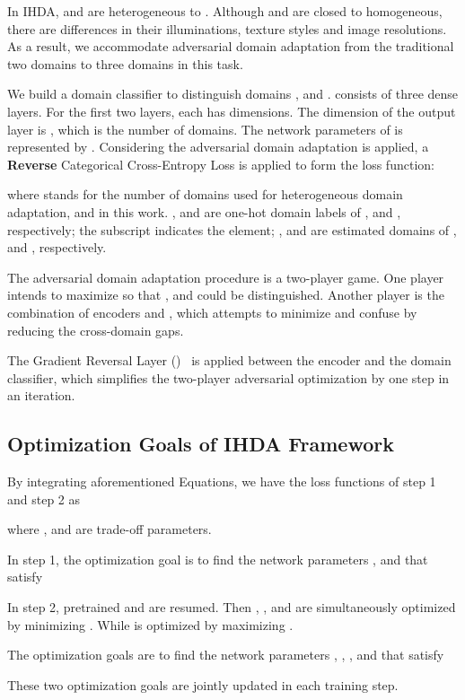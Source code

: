 \documentclass[journal]{IEEEtran}
\begin{document}
In IHDA,  and  are heterogeneous to . Although  and  are closed to homogeneous, there are differences in their illuminations, texture styles and image resolutions. As a result, we accommodate adversarial domain adaptation from the traditional two domains to three domains in this task. 

We build a domain classifier  to distinguish domains ,  and .  consists of three dense layers. For the first two layers, each has  dimensions. The dimension of the output layer is , which is the number of domains. The network parameters of  is represented by . Considering the adversarial domain adaptation is applied, a \textbf{Reverse} Categorical Cross-Entropy Loss is applied to form the loss function:

where  stands for the number of domains used for heterogeneous domain adaptation, and  in this work. ,  and  are one-hot domain labels of ,  and , respectively; the subscript  indicates the  element; ,  and  are estimated domains of ,  and , respectively. 

The adversarial domain adaptation procedure is a two-player game. One player  intends to maximize  so that ,  and  could be distinguished. Another player is the combination of encoders  and , which attempts to minimize  and confuse  by reducing the cross-domain gaps.

The Gradient Reversal Layer ()~\cite{ganin2015unsupervised} is applied between the encoder and the domain classifier, which simplifies the two-player adversarial optimization by one step in an iteration.

\subsection{Optimization Goals of IHDA Framework}
By integrating aforementioned Equations, we have the loss functions of step 1 and step 2 as

where ,  and  are trade-off parameters.

In step 1, the optimization goal is to find the network parameters ,  and  that satisfy




In step 2, pretrained  and  are resumed. Then , ,  and  are simultaneously optimized by minimizing . While  is optimized by maximizing .

The optimization goals are to find the network parameters , , ,  and  that satisfy


These two optimization goals are jointly updated in each training step.
\end{document}
